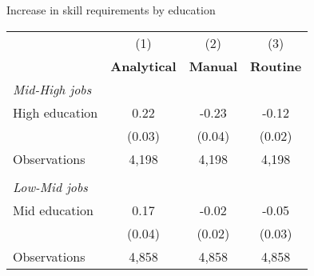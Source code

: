 \begin{center}
\begin{threeparttable}[!h]
\caption{Increase in skill requirements by education}
\label{tab:skillRegs}
\begin{tabular}{lccc}
\toprule
\toprule
&\multicolumn{1}{c}{(1)}&\multicolumn{1}{c}{(2)}&\multicolumn{1}{c}{(3)} \\
\textbf{}&\multicolumn{1}{c}{\textbf{Analytical}}&\multicolumn{1}{c}{\textbf{Manual}}&\multicolumn{1}{c}{\textbf{Routine}} \\
\midrule
\textit{Mid-High jobs } \\ 
High education      &        0.22\sym{***}&       -0.23\sym{***}&       -0.12\sym{***}\\
                    &      (0.03)         &      (0.04)         &      (0.02)         \\
\midrule Observations&       4,198         &       4,198         &       4,198         \\
\\
\textit{Low-Mid jobs  } \\
Mid education       &        0.17\sym{***}&       -0.02         &       -0.05         \\
                    &      (0.04)         &      (0.02)         &      (0.03)         \\
\midrule Observations&       4,858         &       4,858         &       4,858         \\
\bottomrule
\bottomrule
\end{tabular}
\end{threeparttable}
\end{center}
